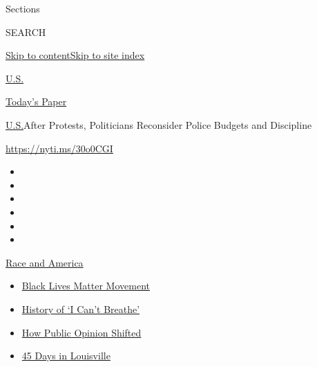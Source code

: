 Sections

SEARCH

\protect\hyperlink{site-content}{Skip to
content}\protect\hyperlink{site-index}{Skip to site index}

\href{https://www.nytimes.com/section/us}{U.S.}

\href{https://myaccount.nytimes.com/auth/login?response_type=cookie\&client_id=vi}{}

\href{https://www.nytimes.com/section/todayspaper}{Today's Paper}

\href{/section/us}{U.S.}\textbar{}After Protests, Politicians Reconsider
Police Budgets and Discipline

\url{https://nyti.ms/30o0CGI}

\begin{itemize}
\item
\item
\item
\item
\item
\item
\end{itemize}

\href{https://www.nytimes.com/news-event/george-floyd-protests-minneapolis-new-york-los-angeles?action=click\&pgtype=Article\&state=default\&region=TOP_BANNER\&context=storylines_menu}{Race
and America}

\begin{itemize}
\tightlist
\item
  \href{https://www.nytimes.com/interactive/2020/07/03/us/george-floyd-protests-crowd-size.html?action=click\&pgtype=Article\&state=default\&region=TOP_BANNER\&context=storylines_menu}{Black
  Lives Matter Movement}
\item
  \href{https://www.nytimes.com/interactive/2020/06/28/us/i-cant-breathe-police-arrest.html?action=click\&pgtype=Article\&state=default\&region=TOP_BANNER\&context=storylines_menu}{History
  of `I Can't Breathe'}
\item
  \href{https://www.nytimes.com/interactive/2020/06/10/upshot/black-lives-matter-attitudes.html?action=click\&pgtype=Article\&state=default\&region=TOP_BANNER\&context=storylines_menu}{How
  Public Opinion Shifted}
\item
  \href{https://www.nytimes.com/interactive/2020/07/16/us/black-lives-matter-protests-louisville-breonna-taylor.html?action=click\&pgtype=Article\&state=default\&region=TOP_BANNER\&context=storylines_menu}{45
  Days in Louisville}
\end{itemize}

